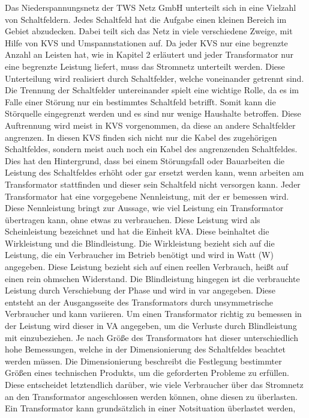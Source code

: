 Das Niederspannungsnetz der TWS Netz GmbH unterteilt sich in eine Vielzahl von Schaltfeldern. Jedes Schaltfeld hat die Aufgabe einen kleinen Bereich im Gebiet 
abzudecken. Dabei teilt sich das Netz in viele verschiedene Zweige, mit Hilfe von KVS und Umspannstationen auf. Da jeder KVS nur eine begrenzte Anzahl an 
Leisten hat, wie in Kapitel 2 erläutert und jeder Transformator nur eine begrenzte Leistung liefert, muss das Stromnetz unterteilt werden. Diese Unterteilung wird 
realisiert durch Schaltfelder, welche voneinander getrennt sind. Die Trennung der Schaltfelder untereinander spielt eine wichtige Rolle, da es im Falle 
einer Störung nur ein bestimmtes Schaltfeld betrifft. Somit kann die Störquelle eingegrenzt werden und es sind nur wenige Haushalte betroffen. Diese 
Auftrennung wird meist in KVS vorgenommen, da diese an andere Schaltfelder angrenzen. In diesen KVS finden sich nicht nur die Kabel des zugehörigen 
Schaltfeldes, sondern meist auch noch ein Kabel des angrenzenden Schaltfeldes. Dies hat den Hintergrund, dass bei einem Störungsfall oder Bauarbeiten die 
Leistung des Schaltfeldes erhöht oder gar ersetzt werden kann, wenn \zB arbeiten am Transformator stattfinden und dieser sein Schaltfeld nicht versorgen kann. 
Jeder Transformator hat eine vorgegebene Nennleistung, mit der er bemessen wird. Diese Nennleistung bringt zur Aussage, wie viel Leistung ein Transformator übertragen kann, 
ohne etwas zu verbrauchen. Diese Leistung wird als Scheinleistung bezeichnet und hat die Einheit kVA. Diese beinhaltet die Wirkleistung und die Blindleistung. 
Die Wirkleistung bezieht sich auf die Leistung, die ein Verbraucher im Betrieb benötigt und wird in Watt (W) angegeben. Diese Leistung bezieht sich auf 
einen reellen Verbrauch, heißt auf einen rein ohmschen Widerstand. Die Blindleistung hingegen ist die verbrauchte Leistung durch Verschiebung der Phase und 
wird in var angegeben. %
Diese entsteht an der Ausgangsseite des Transformators durch unsymmetrische Verbraucher und kann variieren. Um einen Transformator richtig zu
bemessen in der Leistung wird dieser in VA angegeben, um die Verluste durch Blindleistung mit einzubeziehen. Je nach Größe des Transformators hat dieser 
unterschiedlich hohe Bemessungen, welche in der Dimensionierung des Schaltfeldes beachtet werden müssen. Die Dimensionierung beschreibt die Festlegung 
bestimmter Größen eines technischen Produkts, um die geforderten Probleme zu erfüllen. Diese entscheidet letztendlich darüber, wie viele Verbraucher über 
das Stromnetz an den Transformator angeschlossen werden können, ohne diesen zu überlasten. Ein Transformator kann grundsätzlich in einer Notsituation überlastet werden, 
